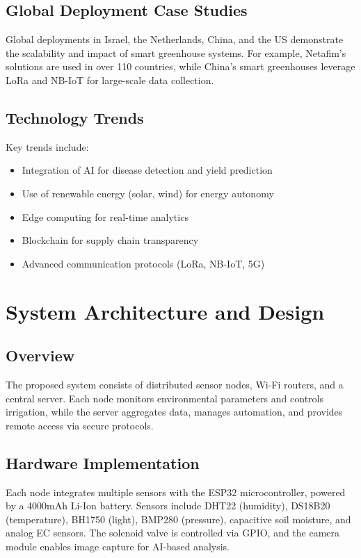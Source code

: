 \documentclass[12pt,a4paper]{article}
\begin{document}
\subsection{Global Deployment Case Studies}
Global deployments in Israel, the Netherlands, China, and the US demonstrate the scalability and impact of smart greenhouse systems. For example, Netafim's solutions are used in over 110 countries, while China's smart greenhouses leverage LoRa and NB-IoT for large-scale data collection.

\subsection{Technology Trends}
Key trends include:
\begin{itemize}
    \item Integration of AI for disease detection and yield prediction
    \item Use of renewable energy (solar, wind) for energy autonomy
    \item Edge computing for real-time analytics
    \item Blockchain for supply chain transparency
    \item Advanced communication protocols (LoRa, NB-IoT, 5G)
\end{itemize}

\section{System Architecture and Design}
\subsection{Overview}
The proposed system consists of distributed sensor nodes, Wi-Fi routers, and a central server. Each node monitors environmental parameters and controls irrigation, while the server aggregates data, manages automation, and provides remote access via secure protocols.

\subsection{Hardware Implementation}
Each node integrates multiple sensors with the ESP32 microcontroller, powered by a 4000mAh Li-Ion battery. Sensors include DHT22 (humidity), DS18B20 (temperature), BH1750 (light), BMP280 (pressure), capacitive soil moisture, and analog EC sensors. The solenoid valve is controlled via GPIO, and the camera module enables image capture for AI-based analysis.
\end{document}
